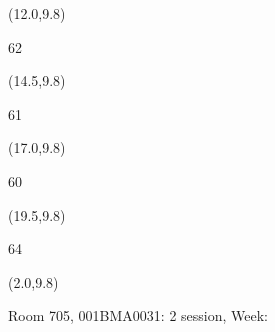 \documentclass[a4paper]{article}
\newcommand{\myseat}[4]{%
\vspace{-0.1cm} \hspace{-0.5cm}
\parbox[t][2.2cm][t]{3.5cm}{%
\small #1 %
\begin{description}
\vspace{-0.1cm}
\item [ID:] #2
\vspace{-0.1cm}
\item [Team:] #3 \normalsize
\vspace{-0.1cm}
\item \normalsize #4
\vspace{-0.1cm}
\end{description}
}
}
\begin{document}
\begin{textblock}{2.5}(12.0,9.8)
\textblockcolor{}
\myseat{62}{}{}{}
\end{textblock}

\begin{textblock}{2.5}(14.5,9.8)
\textblockcolor{}
\myseat{61}{}{}{}
\end{textblock}

\begin{textblock}{2.5}(17.0,9.8)
\textblockcolor{}
\myseat{60}{}{}{}
\end{textblock}

\begin{textblock}{2.5}(19.5,9.8)
\textblockcolor{}
\myseat{64}{}{}{}
\end{textblock}

\begin{textblock}{10}(2.0,9.8)
\textblockcolor{}
\parbox[t][2.2cm][t]{9.5cm}{%
\large Room 705, 001BMA0031: 2 session, Week: 
\vspace{-0.3cm} \hspace{-0.5cm}
}
\end{textblock}
\end{document}
